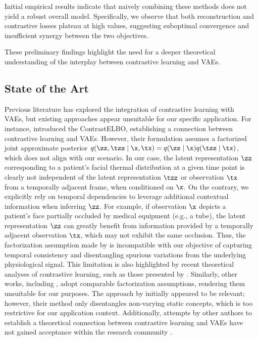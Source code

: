 Initial empirical results indicate that naively combining these methods does not yield a robust overall model. Specifically, we observe that both reconstruction and contrastive losses plateau at high values, suggesting suboptimal convergence and insufficient synergy between the two objectives.

These preliminary findings highlight the need for a deeper theoretical understanding of the interplay between contrastive learning and VAEs.

\subsection{State of the Art}

Previous literature has explored the integration of contrastive learning with VAEs, but existing approaches appear unsuitable for our specific application. For instance, \citet{wang2022contrastvae} introduced the ContrastELBO, establishing a connection between contrastive learning and VAEs. However, their formulation assumes a factorized joint approximate posterior \( q(\zz,\tzz \mid \x, \tx) = q(\zz \mid \x)q(\tzz \mid \tx) \), which does not align with our scenario. In our case, the latent representation \(\zz\) corresponding to a patient's facial thermal distribution at a given time point is clearly not independent of the latent representation \(\tzz\) or observation \(\tx\) from a temporally adjacent frame, when conditioned on $\x$. On the contrary, we explicitly rely on temporal dependencies to leverage additional contextual information when inferring $\zz$. For example, if observation \(\x\) depicts a patient's face partially occluded by medical equipment (e.g., a tube), the latent representation \(\zz\) can greatly benefit from information provided by a temporally adjacent observation \(\tx\), which may not exhibit the same occlusion. Thus, the factorization assumption made by \citet{wang2022contrastvae} is incompatible with our objective of capturing temporal consistency and disentangling spurious variations from the underlying physiological signal. This limitation is also highlighted by recent theoretical analyses of contrastive learning, such as those presented by \citet{Zimmermann2021-ax}. Similarly, other works, including \cite{abid2019contrastive}, adopt comparable factorization assumptions, rendering them unsuitable for our purposes.
The approach by \citet{bai2021contrastively} initially appeared to be relevant; however, their method only disentangles non-varying static concepts, which is too restrictive for our application context. Additionally, attempts by other authors to establish a theoretical connection between contrastive learning and VAEs have not gained acceptance within the research community \citep{anonymous2022infonce}.

